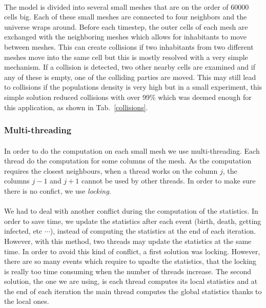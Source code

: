 \documentclass{report}
\begin{document}
\paragraph{}
The model is divided into several small meshes that are on the order of 60000 cells big. Each of these small meshes are connected to four neighbors and the universe wraps around. Before each timestep, the outer cells of each mesh are exchanged with the neighboring meshes which allows for inhabitants to move between meshes. This can create collisions if two inhabitants from two different meshes move into the same cell but this is mostly resolved with a very simple mechanism. If a collision is detected, two other nearby cells are examined and if any of these is empty, one of the colliding parties are moved. This may still lead to collisions if the populations density is very high but in a small experiment, this simple solution reduced collisions with over 99\% which was deemed enough for this application, as shown in Tab.~\ref{collisions}.

\subsubsection{Multi-threading}
\paragraph{}
In order to do the computation on each small mesh we use multi-threading. Each thread do the computation for some columns of the mesh. As the computation requires the closest neighbours, when a thread works on the column $j$, the columns $j-1$ and $j+1$ cannot be used by other threads. In order to make sure there is no confict, we use \emph{locking}.
\paragraph{}
We had to deal with another conflict during the computation of the statistics. In order to save time, we update the statistics after each event (birth, death, getting infected, etc $\cdots$), instead of computing the statistics at the end of each iteration. However, with this method, two threads may update the statistics at the same time. In order to avoid this kind of conflict, a first solution was locking. However, there are so many events which require to upadte the statistics, that the locking is really too time consuming when the number of threads increase. The second solution, the one we are using, is each thread computes its local statistics and at the end of each iteration the main thread computes the global statistics thanks to the local ones.
 
\end{document}
